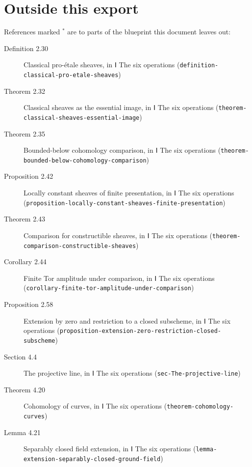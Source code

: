 \documentclass[11pt]{article}
\newcommand{\bpslug}[1]{\texttt{#1}}
\begin{document}
\clearpage{}\hypertarget{bp-outside}{}%
\section*{Outside this export}
References marked \ensuremath{{}^\ast} are to parts of the blueprint this document leaves out:
\begin{description}
\item[Definition 2.30] Classical pro-étale sheaves, in Ⅰ The six operations (\bpslug{definition-{}\allowbreak{}classical-{}\allowbreak{}pro-{}\allowbreak{}etale-{}\allowbreak{}sheaves})
\item[Theorem 2.32] Classical sheaves as the essential image, in Ⅰ The six operations (\bpslug{theorem-{}\allowbreak{}classical-{}\allowbreak{}sheaves-{}\allowbreak{}essential-{}\allowbreak{}image})
\item[Theorem 2.35] Bounded-below cohomology comparison, in Ⅰ The six operations (\bpslug{theorem-{}\allowbreak{}bounded-{}\allowbreak{}below-{}\allowbreak{}cohomology-{}\allowbreak{}comparison})
\item[Proposition 2.42] Locally constant sheaves of finite presentation, in Ⅰ The six operations (\bpslug{proposition-{}\allowbreak{}locally-{}\allowbreak{}constant-{}\allowbreak{}sheaves-{}\allowbreak{}finite-{}\allowbreak{}presentation})
\item[Theorem 2.43] Comparison for constructible sheaves, in Ⅰ The six operations (\bpslug{theorem-{}\allowbreak{}comparison-{}\allowbreak{}constructible-{}\allowbreak{}sheaves})
\item[Corollary 2.44] Finite Tor amplitude under comparison, in Ⅰ The six operations (\bpslug{corollary-{}\allowbreak{}finite-{}\allowbreak{}tor-{}\allowbreak{}amplitude-{}\allowbreak{}under-{}\allowbreak{}comparison})
\item[Proposition 2.58] Extension by zero and restriction to a closed subscheme, in Ⅰ The six operations (\bpslug{proposition-{}\allowbreak{}extension-{}\allowbreak{}zero-{}\allowbreak{}restriction-{}\allowbreak{}closed-{}\allowbreak{}subscheme})
\item[Section 4.4] The projective line, in Ⅰ The six operations (\bpslug{sec-{}\allowbreak{}The-{}\allowbreak{}projective-{}\allowbreak{}line})
\item[Theorem 4.20] Cohomology of curves, in Ⅰ The six operations (\bpslug{theorem-{}\allowbreak{}cohomology-{}\allowbreak{}curves})
\item[Lemma 4.21] Separably closed field extension, in Ⅰ The six operations (\bpslug{lemma-{}\allowbreak{}extension-{}\allowbreak{}separably-{}\allowbreak{}closed-{}\allowbreak{}ground-{}\allowbreak{}field})

\end{description}
\end{document}
